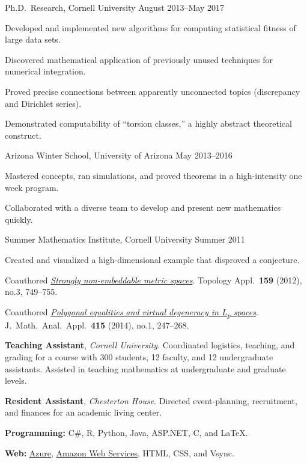\documentclass[11pt, letterpaper]{awesome-cv}
\begin{document}

\begin{cventries}

\cventry
	{Ph.D.~Research, Cornell University}
	{}{}
	{August 2013--May 2017}
	{
		\begin{cvitems}
			\item{Developed and implemented new algorithms for computing statistical fitness of large data sets.}
			\item{Discovered mathematical application of previously unused techniques for numerical integration.}
			\item{Proved precise connections between apparently unconnected topics (discrepancy and Dirichlet series).}
			\item{Demonstrated computability of ``torsion classes,'' a highly abstract theoretical construct.}
		\end{cvitems}
	}
		
\cventry
	{Arizona Winter School, University of Arizona}
	{}{}
	{May 2013--2016}
	{
		\begin{cvitems}
			\item{Mastered concepts, ran simulations, and proved theorems in a high-intensity one week program.}
			\item{Collaborated with a diverse team to develop and present new mathematics quickly.}
		\end{cvitems}
	}
	
\cventry
	{Summer Mathematics Institute, Cornell University}
	{}{}
	{Summer 2011}
	{
		\begin{cvitems}
			\item{Created and visualized a high-dimensional example that disproved a conjecture.}
			\item{Coauthored \href{http://dx.doi.org/10.1016/j.topol.2011.11.041}{\emph{Strongly non-embeddable metric spaces}}. Topology Appl.~\textbf{159} (2012), no.3, 749--755.}
			\item{Coauthored \href{http://dx.doi.org/10.1016/j.jmaa.2014.01.063}{\emph{Polygonal equalities and virtual degeneracy in L\textsubscript{p} spaces}}. J.~Math.~Anal.~Appl.~\textbf{415} (2014), no.1, 247--268.}
		\end{cvitems}
	}
\end{cventries}






\begin{cvparagraph}
\textbf{Teaching Assistant}, \emph{Cornell University}. Coordinated logistics, teaching, and grading for a course with 300 students, 12 faculty, and 12 undergraduate assistants.
Assisted in teaching mathematics at undergraduate and graduate levels.

\textbf{Resident Assistant}, \emph{Chesterton House}. Directed event-planning, recruitment, and finances for an academic living center. 
\end{cvparagraph}






\begin{cvparagraph}
\textbf{Programming:} C\#, R, Python, Java, ASP.NET, C, and \LaTeX.

\textbf{Web:} \href{https://azure.microsoft.com/}{Azure}, \href{https://aws.amazon.com/}{Amazon Web Services}, HTML, CSS, and Vsync.
\end{cvparagraph}
\end{document}
